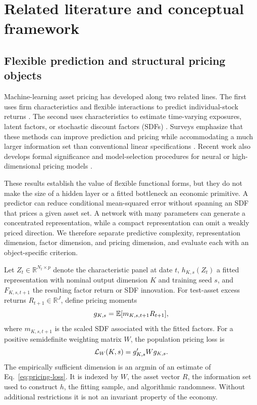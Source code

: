 \section{Related literature and conceptual framework}

\subsection{Flexible prediction and structural pricing objects}

Machine-learning asset pricing has developed along two related lines. The first uses firm characteristics and flexible interactions to predict individual-stock returns \citep{gu2020empirical,avramov2023machine,leippold2022machine}. The second uses characteristics to estimate time-varying exposures, latent factors, or stochastic discount factors (SDFs) \citep{kelly2019characteristics,gu2021autoencoder,chen2024deep,feng2024deep}. Surveys emphasize that these methods can improve prediction and pricing while accommodating a much larger information set than conventional linear specifications \citep{giglio2022factor,bagnara2024review,karolyi2020new}. Recent work also develops formal significance and model-selection procedures for neural or high-dimensional pricing models \citep{fallahgoul2024significance,feng2026stepwise}.

These results establish the value of flexible functional forms, but they do not make the size of a hidden layer or a fitted bottleneck an economic primitive. A predictor can reduce conditional mean-squared error without spanning an SDF that prices a given asset set. A network with many parameters can generate a concentrated representation, while a compact representation can omit a weakly priced direction. We therefore separate predictive complexity, representation dimension, factor dimension, and pricing dimension, and evaluate each with an object-specific criterion.

Let $Z_t\in\mathbb{R}^{N_t\times p}$ denote the characteristic panel at date $t$, $h_{K,s}(Z_t)$ a fitted representation with nominal output dimension $K$ and training seed $s$, and $F_{K,s,t+1}$ the resulting factor return or SDF innovation. For test-asset excess returns $R_{t+1}\in\mathbb{R}^{J}$, define pricing moments
\begin{equation}
 g_{K,s}=\mathbb{E}[m_{K,s,t+1}R_{t+1}],
\end{equation}
where $m_{K,s,t+1}$ is the scaled SDF associated with the fitted factors. For a positive semidefinite weighting matrix $W$, the population pricing loss is
\begin{equation}
 \mathcal{L}_W(K,s)=g_{K,s}'Wg_{K,s}.
 \label{eq:pricing-loss}
\end{equation}
The empirically sufficient dimension is an argmin of an estimate of Eq.~\eqref{eq:pricing-loss}. It is indexed by $W$, the asset vector $R$, the information set used to construct $h$, the fitting sample, and algorithmic randomness. Without additional restrictions it is not an invariant property of the economy.

